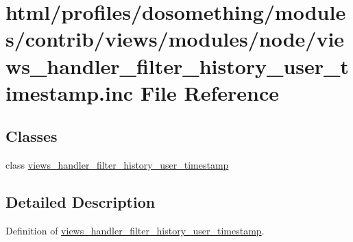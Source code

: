 \hypertarget{views__handler__filter__history__user__timestamp_8inc}{
\section{html/profiles/dosomething/modules/contrib/views/modules/node/views\_\-handler\_\-filter\_\-history\_\-user\_\-timestamp.inc File Reference}
\label{views__handler__filter__history__user__timestamp_8inc}
}
\subsection*{Classes}
\begin{DoxyCompactItemize}
\item 
class \hyperlink{classviews__handler__filter__history__user__timestamp}{views\_\-handler\_\-filter\_\-history\_\-user\_\-timestamp}
\end{DoxyCompactItemize}


\subsection{Detailed Description}
Definition of \hyperlink{classviews__handler__filter__history__user__timestamp}{views\_\-handler\_\-filter\_\-history\_\-user\_\-timestamp}. 